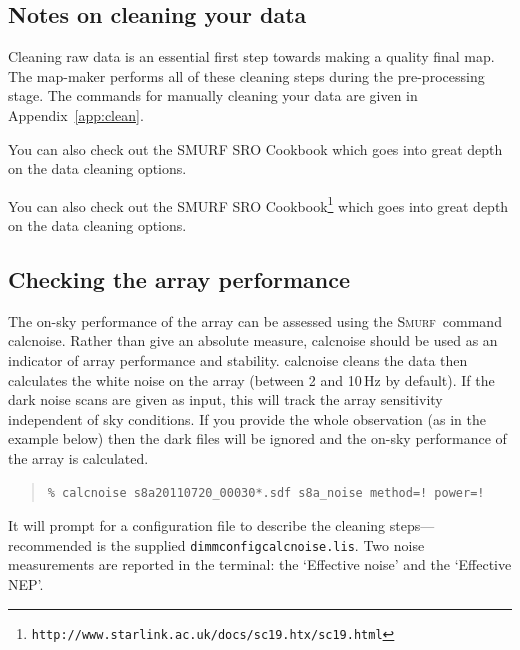 \documentclass[twoside,11pt]{article}
\newcommand{\htmlref}[2]{#1}
\newenvironment{latexonly}{}{}
\newcommand{\latexhtml}[2]{#1}
\newcommand{\xref}[3]{#1}
\newcommand{\xlabel}[1]{}
\renewcommand{\_}{\texttt{\symbol{95}}}
\newenvironment{myquote}{\begin{quote}\begin{small}}{\end{small}\end{quote}}
\newcommand{\smurf}{\xref{\textsc{Smurf}}{sun258}{}}
\newcommand{\task}[1]{\textsf{#1}}
\newcommand{\calcnoise}{\xref{\task{calcnoise}}{sun258}{CALCNOISE}}
\newcommand{\cref}[3]{\latexhtml{#1~\ref{#2}}{\htmlref{#3}{#2}}}
\begin{document}
\subsection{\xlabel{clean}Notes on cleaning your data}
\label{sec:clean}

Cleaning raw data is an essential first step towards making a quality
final map. The map-maker performs all of these cleaning steps during
the pre-processing stage. The commands for manually cleaning your data
are given in \cref{Appendix}{app:clean}{Cleaning the Raw Data}.

\begin{htmlonly}
You can also check out the \xref{SMURF SRO Cookbook}{sc19}{} which
goes into great depth on the data cleaning options.
\end{htmlonly}
\begin{latexonly}
You can also check out the SMURF SRO
Cookbook{\footnote{\texttt{http://www.starlink.ac.uk/docs/sc19.htx/sc19.html}}}
which goes into great depth on the data cleaning options.
\end{latexonly}


\subsection{\xlabel{calcnoise}Checking the array performance}
\label{sec:calcnoise}

The on-sky performance of the array can be assessed using the \smurf\
command \calcnoise. Rather than give an absolute measure, \task{calcnoise}
should be used as an indicator of array performance and stability.
\task{calcnoise} cleans the data then calculates the
white noise on the array (between 2 and 10\,Hz by default). If the
dark noise scans are given as input, this will track the array
sensitivity independent of sky conditions. If you provide the whole
observation (as in the example below) then the dark files will be
ignored and the on-sky performance of the array is calculated.

\begin{myquote}
\begin{verbatim}
% calcnoise s8a20110720_00030*.sdf s8a_noise method=! power=!
\end{verbatim}
\end{myquote}
It will prompt for a configuration file to describe the cleaning
steps---recommended is the supplied \texttt{dimmconfig\_calcnoise.lis}.
Two noise measurements are reported in the terminal: the
`Effective noise' and the `Effective NEP'.
\end{document}
